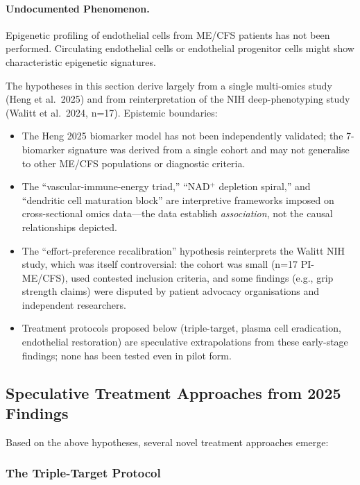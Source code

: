 \paragraph{Undocumented Phenomenon.} Epigenetic profiling of endothelial cells from ME/CFS patients has not been performed. Circulating endothelial cells or endothelial progenitor cells might show characteristic epigenetic signatures.

\begin{limitation}
The hypotheses in this section derive largely from a single multi-omics study (Heng et al.\ 2025) and from reinterpretation of the NIH deep-phenotyping study (Walitt et al.\ 2024, n=17). Epistemic boundaries:
\begin{itemize}
    \item The Heng 2025 biomarker model has not been independently validated; the 7-biomarker signature was derived from a single cohort and may not generalise to other ME/CFS populations or diagnostic criteria.
    \item The ``vascular-immune-energy triad,'' ``NAD$^+$ depletion spiral,'' and ``dendritic cell maturation block'' are interpretive frameworks imposed on cross-sectional omics data---the data establish \emph{association}, not the causal relationships depicted.
    \item The ``effort-preference recalibration'' hypothesis reinterprets the Walitt NIH study, which was itself controversial: the cohort was small (n=17 PI-ME/CFS), used contested inclusion criteria, and some findings (e.g., grip strength claims) were disputed by patient advocacy organisations and independent researchers.
    \item Treatment protocols proposed below (triple-target, plasma cell eradication, endothelial restoration) are speculative extrapolations from these early-stage findings; none has been tested even in pilot form.
\end{itemize}
\end{limitation}

\subsection{Speculative Treatment Approaches from 2025 Findings}

Based on the above hypotheses, several novel treatment approaches emerge:

\subsubsection{The Triple-Target Protocol}

